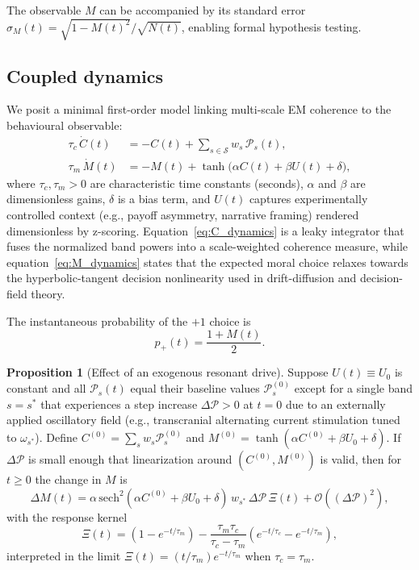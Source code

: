 \documentclass[12pt,a4paper]{article}
\theoremstyle{definition}
\newtheorem{proposition}{Proposition}[section]
\begin{document}
The observable $M$ can be accompanied by its standard error $\sigma_M(t) = \sqrt{1 - M(t)^2}/\sqrt{N(t)}$, enabling formal hypothesis testing.

\subsection{Coupled dynamics}

We posit a minimal first-order model linking multi-scale EM coherence to the behavioural observable:
\begin{align}
\tau_c \, \dot{C}(t) &= -C(t) + \sum_{s \in \mathcal{S}} w_s \, \mathcal{P}_s(t), \label{eq:C_dynamics}\\
\tau_m \, \dot{M}(t) &= -M(t) + \tanh\!\big(\alpha C(t) + \beta U(t) + \delta\big), \label{eq:M_dynamics}
\end{align}
where $\tau_c, \tau_m > 0$ are characteristic time constants (seconds), $\alpha$ and $\beta$ are dimensionless gains, $\delta$ is a bias term, and $U(t)$ captures experimentally controlled context (e.g., payoff asymmetry, narrative framing) rendered dimensionless by z-scoring. Equation~\eqref{eq:C_dynamics} is a leaky integrator that fuses the normalized band powers into a scale-weighted coherence measure, while equation~\eqref{eq:M_dynamics} states that the expected moral choice relaxes towards the hyperbolic-tangent decision nonlinearity used in drift-diffusion and decision-field theory.

The instantaneous probability of the $+1$ choice is
\begin{equation}
p_{+}(t) = \frac{1 + M(t)}{2}.
\end{equation}

\begin{proposition}[Effect of an exogenous resonant drive]
Suppose $U(t) \equiv U_0$ is constant and all $\mathcal{P}_s(t)$ equal their baseline values $\mathcal{P}_s^{(0)}$ except for a single band $s = s^\ast$ that experiences a step increase $\Delta \mathcal{P} > 0$ at $t=0$ due to an externally applied oscillatory field (e.g., transcranial alternating current stimulation tuned to $\omega_{s^\ast}$). Define $C^{(0)} = \sum_{s} w_s \mathcal{P}_s^{(0)}$ and $M^{(0)} = \tanh(\alpha C^{(0)} + \beta U_0 + \delta)$. If $\Delta \mathcal{P}$ is small enough that linearization around $(C^{(0)},M^{(0)})$ is valid, then for $t \ge 0$ the change in $M$ is
\begin{equation}
\Delta M(t) = \alpha \, \mathrm{sech}^2(\alpha C^{(0)} + \beta U_0 + \delta) \, w_{s^\ast} \, \Delta \mathcal{P} \, \Xi(t) + \mathcal{O}((\Delta \mathcal{P})^2),
\end{equation}
with the response kernel
\begin{equation}
\Xi(t) = \left(1 - e^{-t/\tau_m}\right) - \frac{\tau_m \tau_c}{\tau_c - \tau_m} \left(e^{-t/\tau_c} - e^{-t/\tau_m}\right),
\end{equation}
interpreted in the limit $\Xi(t) = (t/\tau_m) e^{-t/\tau_m}$ when $\tau_c = \tau_m$.
\end{proposition}
\end{document}
